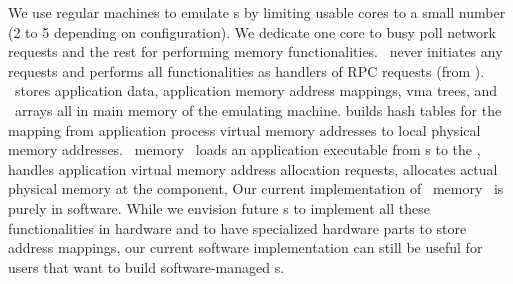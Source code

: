 \documentclass[10pt,times,twocolumn]{z2-article}
\begin{document}
{{{{{{{We use regular machines to emulate \mcomponent{}s 
by limiting usable cores to a small number (2 to 5 depending on configuration).
We dedicate one core to busy poll network requests 
and the rest for performing memory functionalities. 
\mcomponent\ never initiates any requests and performs all functionalities
as handlers of RPC requests (from \pcomponent).
\lego\ stores application data, application memory address mappings, vma trees, and \vregion\ arrays all
in main memory of the emulating machine. 
 builds hash tables for the mapping from application process virtual memory addresses to 
local physical memory addresses.
\lego\ memory \microos\ loads an application executable from \scomponent{}s 
to the \mcomponent, handles application virtual memory address allocation requests,
allocates actual physical memory at the component,
Our current implementation of \lego\ memory \microos\ is purely in software.
While we envision future \mcomponent{}s to implement all these functionalities in hardware and
to have specialized hardware parts to store address mappings,
our current software implementation can still be useful for 
users that want to build software-managed \mcomponent{}s.

}}}}}}}
\end{document}
